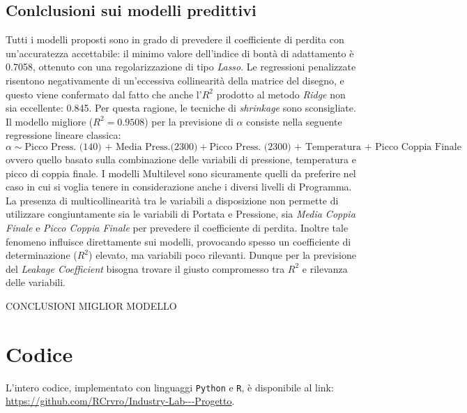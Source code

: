 \documentclass[fleqn,10pt]{SelfArx} %
\begin{document}
\subsection{Conlclusioni sui modelli predittivi}
Tutti i modelli proposti sono in grado di prevedere il coefficiente di perdita con un'accuratezza accettabile: il minimo valore dell'indice di bontà di adattamento è 0.7058, ottenuto con una regolarizzazione di tipo \textit{Lasso}. Le regressioni penalizzate risentono negativamente di un'eccessiva collinearità della matrice del disegno, e questo viene confermato dal fatto che anche l'$R^2$ prodotto al metodo \textit{Ridge} non sia eccellente: 0.845. Per questa ragione, le tecniche di \textit{shrinkage} sono sconsigliate.\\
Il modello migliore ($R^2=0.9508$) per la previsione di $\alpha$ consiste nella seguente regressione lineare classica:
$$\alpha\sim\text{Picco Press. (140) + Media Press.(2300)}+\text{Picco Press. (2300) + Temperatura + Picco Coppia Finale}$$
ovvero quello basato sulla combinazione delle variabili di pressione, temperatura e picco di coppia finale.
I modelli Multilevel sono sicuramente quelli da preferire nel caso in cui si voglia tenere in considerazione anche i diversi livelli di Programma.
La presenza di multicollinearità tra le variabili a disposizione non permette di utilizzare congiuntamente sia le variabili di Portata e Pressione, sia \textit{Media Coppia Finale} e \textit{Picco Coppia Finale} per prevedere il coefficiente di perdita. Inoltre tale fenomeno influisce direttamente sui modelli, provocando spesso un coefficiente di determinazione ($R^2$) elevato, ma variabili poco rilevanti. Dunque per la previsione del \textit{Leakage Coefficient} bisogna trovare il giusto compromesso tra $R^2$ e rilevanza delle variabili. 

CONCLUSIONI MIGLIOR MODELLO

\section*{Codice}
L'intero codice, implementato con linguaggi \texttt{Python} e \texttt{R}, è disponibile al link: \url{https://github.com/RCrvro/Industry-Lab---Progetto}.



\end{document}
